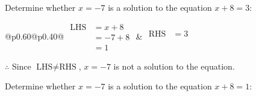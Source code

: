 \documentclass[12pt]{article}
\newcounter{minipagecount}
\begin{document}
\begin{multicols}{2}
\begin{minipage}[t]{0.40\textwidth}
    \noindent Determine whether \(x = -7\) is a solution to the equation \(x + 8 = 3\):
    \vspace{4pt}  %

    \noindent
    \renewcommand{\arraystretch}{1.3} %
    \begin{tabular}{@{}p{0.60\linewidth}@{}p{0.40\linewidth}@{}}
        \(\begin{aligned}
            \text{LHS} &= x + 8 \\
                    &= -7 + 8 \\
                    &= 1 
        \end{aligned}\) &
        \(\begin{aligned}
            \text{RHS} &= 3\\
                    & \\
                    &
        \end{aligned}\)
    \end{tabular}
    \renewcommand{\arraystretch}{1.0} %
    \vspace{2pt}  %

    \noindent \(\therefore\) Since \(\text{LHS} \neq \text{RHS}\), \(x = -7\) is not  a solution to the equation.

\end{minipage}

 \vspace*{16pt}
\noindent{(\theminipagecount)}\hspace{0.1mm} %
\begin{minipage}[t]{0.40\textwidth} %

    \noindent Determine whether \(x = -7\) is a solution to the equation \(x + 8 = 1\):
    \vspace{4pt}  %


\end{minipage}
\end{multicols}
\end{document}
